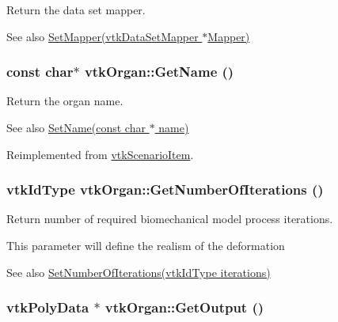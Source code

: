 Return the data set mapper. 

\begin{DoxySeeAlso}{See also}
\hyperlink{classvtkOrgan_aefdce585f74966627c2b5c9d01be8fe3}{SetMapper(vtkDataSetMapper $\ast$Mapper)} 
\end{DoxySeeAlso}
\hypertarget{classvtkOrgan_a8421389b02b00b42b0899b75d00633b4}{
\subsubsection[{GetName}]{\setlength{\rightskip}{0pt plus 5cm}const char$\ast$ vtkOrgan::GetName ()}}
\label{classvtkOrgan_a8421389b02b00b42b0899b75d00633b4}


Return the organ name. 

\begin{DoxySeeAlso}{See also}
\hyperlink{classvtkOrgan_a55ca17e15fea6a6c1672f8b271546e6b}{SetName(const char $\ast$ name)} 
\end{DoxySeeAlso}


Reimplemented from \hyperlink{classvtkScenarioItem_a41ebb204b2879d9dd14a392c1cb3c2fe}{vtkScenarioItem}.

\hypertarget{classvtkOrgan_a99aeadb34310d5ad8b7d8616ea8482ef}{
\subsubsection[{GetNumberOfIterations}]{\setlength{\rightskip}{0pt plus 5cm}vtkIdType vtkOrgan::GetNumberOfIterations ()}}
\label{classvtkOrgan_a99aeadb34310d5ad8b7d8616ea8482ef}


Return number of required biomechanical model process iterations. 

This parameter will define the realism of the deformation \begin{DoxySeeAlso}{See also}
\hyperlink{classvtkOrgan_a97ed046b7c9b8c3cc87939db46e4ec01}{SetNumberOfIterations(vtkIdType iterations)} 
\end{DoxySeeAlso}
\hypertarget{classvtkOrgan_a12141c47bba12d71e1b7d3c02d398f89}{
\subsubsection[{GetOutput}]{\setlength{\rightskip}{0pt plus 5cm}vtkPolyData $\ast$ vtkOrgan::GetOutput ()}}
\label{classvtkOrgan_a12141c47bba12d71e1b7d3c02d398f89}


